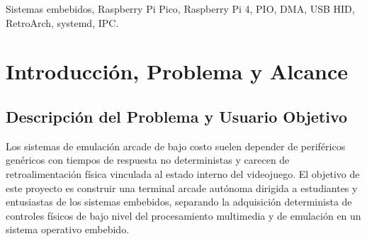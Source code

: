 \documentclass[conference]{IEEEtran}
\begin{document}
\begin{abstract}
Este documento presenta el diseño, implementación y validación experimental de una terminal de juegos retro distribuida basada en hardware embebido. La arquitectura divide responsabilidades entre un nodo esclavo determinista (Raspberry Pi Pico, RP2040) ejecutando firmware \textit{bare-metal} y un nodo maestro (Raspberry Pi 4 Model B) corriendo RetroArch sobre Raspberry Pi OS Lite. El mando embebido adquiere 10 botones digitales mediante dos registros de desplazamiento 74HC165 en cascada con filtrado RC por hardware, gestionados por una máquina de estados PIO y canales DMA encadenados a $292.6\text{ Hz}$ ($3.417\text{ ms}$), junto con ejes analógicos mediante ADC a $4\text{ kHz}$ por canal. La comunicación con la consola opera mediante un enlace único USB HID bidireccional: reportes de entrada de 10 bytes cada $1\text{ ms}$ y reportes de salida de 8 bytes para gobernar actuadores hápticos, sonoros y visuales sin bloquear el lazo principal. En la consola, el despliegue gráfico se realiza por SPI a $50\text{ MHz}$ sobre una pantalla TFT de 3.5 pulgadas mediante DRM/KMS ($18.3\text{ FPS}$ medidos), mientras que un esquema de comunicación entre procesos (UDP local y socket \texttt{AF\_UNIX}) identifica el título activo, extrae telemetría de memoria en tiempo real y controla los actuadores bajo orquestación autónoma con \texttt{systemd}. Se reportan las métricas experimentales de latencia, uso de CPU, huella de memoria, consumo energético y tolerancia a fallas.
\end{abstract}

\begin{IEEEkeywords}
Sistemas embebidos, Raspberry Pi Pico, Raspberry Pi 4, PIO, DMA, USB HID, RetroArch, systemd, IPC.
\end{IEEEkeywords}

\section{Introducción, Problema y Alcance}

\subsection{Descripción del Problema y Usuario Objetivo}
Los sistemas de emulación arcade de bajo costo suelen depender de periféricos genéricos con tiempos de respuesta no deterministas y carecen de retroalimentación física vinculada al estado interno del videojuego. El objetivo de este proyecto es construir una terminal arcade autónoma dirigida a estudiantes y entusiastas de los sistemas embebidos, separando la adquisición determinista de controles físicos de bajo nivel del procesamiento multimedia y de emulación en un sistema operativo embebido.
\end{document}
